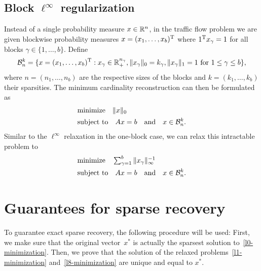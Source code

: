 \documentclass{article} %
\begin{document}
\subsection{Block $\ell^\infty$ regularization}
Instead of a single probability measure $x\in \mathbb{R}^n$, in the traffic
flow problem we are given blockwise probability measures $x = (x_1,
\dots, x_b)^{\rm T}$ where $1^{\rm T} x_\gamma = 1$ for all blocks $\gamma\in
\{1, \dots, b\}$. Define
\begin{equation}
  \mathcal B_n^k = \{x = (x_1, \dots, x_b)^{\rm T} : x_\gamma \in \mathbb{R}_+^{n_\gamma}, \lVert x_\gamma\rVert_0 = k_\gamma, \lVert x_\gamma\rVert_1 = 1\text{ for $1\leq \gamma\leq b$}\},\label{block_measures}
\end{equation}
where $n = (n_1, \dots, n_b)$ are the respective sizes of the blocks
and $k = (k_1, \dots, k_b)$ their sparsities. The minimum cardinality
reconstruction can then be formulated as
\begin{equation}
  \begin{split}
    &\text{minimize}\quad \lVert x\rVert_0\\
    &\text{subject to}\quad Ax = b\quad\text{and}\quad x\in \mathcal B_n^k.
  \end{split}
\end{equation}
Similar to the $\ell^\infty$ relaxation in the one-block case, we can
relax this intractable problem to
\begin{equation}\label{block-relaxation}
  \begin{split}
    &\text{minimize}\quad \textstyle\sum_{\gamma=1}^b {\lVert x_\gamma\rVert_\infty^{-1}}\\
    &\text{subject to}\quad Ax = b\quad\text{and}\quad x\in \mathcal B_n^k.
  \end{split}
\end{equation}

\section{Guarantees for sparse recovery}\label{sec:theory}
To guarantee exact sparse recovery, the following procedure will be used: First, we make sure that the original vector~$x^*$ is actually the sparsest solution to~\eqref{l0-minimization}. Then, we prove that the solution of the relaxed problems~\eqref{l1-minimization} and~\eqref{l8-minimization} are unique and equal to $x^*$.
\end{document}
